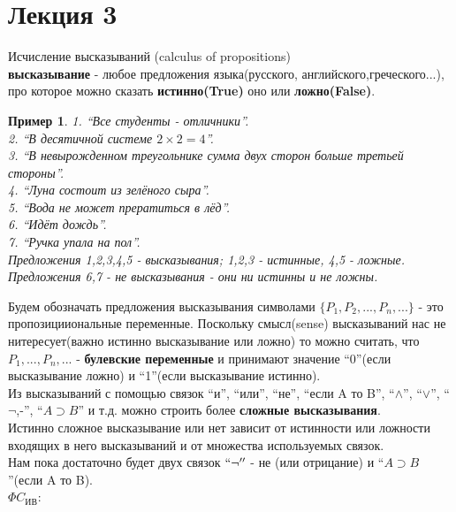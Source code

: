 \documentclass{article}
\newtheorem{example}{Пример}
\numberwithin{example}{section}
\numberwithin{question}{section}
\numberwithin{Remark}{section}
\numberwithin{theorem}{section}
\numberwithin{definition}{section}
\numberwithin{proposition}{section}
\begin{document}
\section{Лекция 3}
Исчисление высказываний (calculus of propositions) \\
\textbf{высказывание} - любое предложения языка(русского, английского,греческого...), про которое можно сказать \textbf{истинно(True)} оно или \textbf{ложно(False)}.
\begin{example}
	1. ``Все студенты - отличники''.\\
	2. ``В десятичной системе $2\times 2=4$''.\\
	3. ``В невырожденном треугольнике сумма двух сторон больше третьей стороны''.\\
	4. ``Луна состоит из зелёного сыра''.\\
	5. ``Вода не может прератиться в лёд''.\\
	6. ``Идёт дождь''.\\
	7. ``Ручка упала на пол''.\\
	Предложения 1,2,3,4,5 - высказывания; 1,2,3 - истинные, 4,5 - ложные.\\
	Предложения 6,7 - не высказывания - они ни истинны и не ложны.
\end{example}
Будем обозначать предложения высказывания символами $\{P_1,P_2,...,P_n,...\}$ - это пропозицииональные переменные. Поскольку смысл(sense) высказываний нас не нитересует(важно истинно высказывание или ложно) то можно считать, что $P_1,...,P_n,...$ - \textbf{булевские переменные} и принимают значение ``0''(если высказывание ложно) и ``1''(если высказывание истинно).\\
Из высказываний с помощью связок ``и'', ``или'', ``не'', ``если A то B'', ``$\land$'', ``$\lor$'', ``$\lnot$,-'', ``$A\supset B$'' и т.д. можно строить более \textbf{сложные высказывания}.\\
Истинно сложное высказывание или нет зависит от истинности или ложности входящих в него высказываний и от множества используемых связок.\\
Нам пока достаточно будет двух связок $``\lnot''$ - не (или отрицание) и ``$A\supset B$''(если A то B).\\
$\Phi C_{\text{ИВ}}:$
\end{document}
